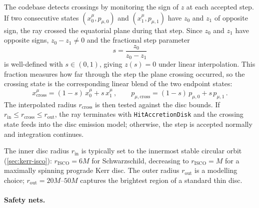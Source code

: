 The codebase detects crossings by monitoring the sign of $z$ at each
accepted step.  If two consecutive states $(x_0^\mu, p_{\mu,0})$ and
$(x_1^\mu, p_{\mu,1})$ have $z_0$ and $z_1$ of opposite sign, the ray
crossed the equatorial plane during that step.  Since $z_0$ and $z_1$
have opposite signs, $z_0 - z_1 \neq 0$ and the fractional step
parameter
%
\begin{equation}
  s = \frac{z_0}{z_0 - z_1}
  \label{eq:disk-crossing-frac}
\end{equation}
%
is well-defined with $s \in (0, 1)$, giving $z(s) = 0$ under linear
interpolation.  This fraction measures how far through the step the
plane crossing occurred, so the crossing state is the corresponding
linear blend of the two endpoint states:
%
\begin{equation}
  x^\mu_{\text{cross}} = (1 - s)\,x^\mu_0 + s\,x^\mu_1 \,, \qquad
  p_{\mu,\text{cross}} = (1 - s)\,p_{\mu,0} + s\,p_{\mu,1} \,.
  \label{eq:disk-crossing-interp}
\end{equation}
%
The interpolated radius $r_{\text{cross}}$ is then tested against the
disc bounds.  If $r_{\text{in}} \leq r_{\text{cross}} \leq r_{\text{out}}$,
the ray terminates with \texttt{HitAccretionDisk} and the crossing state
feeds into the disc emission model; otherwise, the step is accepted
normally and integration continues.

The inner disc radius $r_{\text{in}}$ is typically set to the innermost
stable circular orbit (\cref{sec:kerr-isco}): $r_{\text{ISCO}} = 6M$ for
Schwarzschild, decreasing to $r_{\text{ISCO}} = M$ for a maximally
spinning prograde Kerr disc.  The outer radius $r_{\text{out}}$ is a
modelling choice; $r_{\text{out}} = 20M$--$50M$ captures the brightest
region of a standard thin disc.

\paragraph{Safety nets.}

